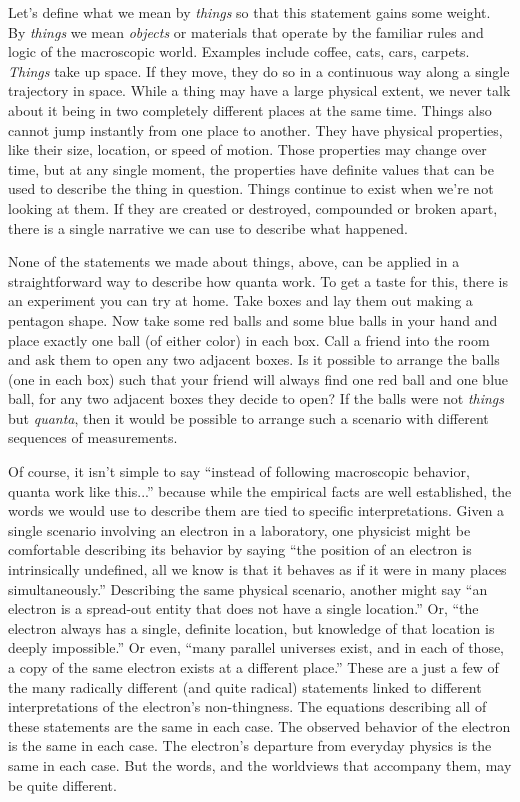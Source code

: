 \documentclass[onecolumn,preprintnumbers,amsmath,amssymbn,reprint,nofootinbib,superscriptaddress]{revtex4}    %
\begin{document}
Let's define what we mean by {\em things} so that this statement gains some weight.  By {\em things} we mean {\em objects} or materials that operate by the familiar rules and logic of the macroscopic world.  Examples include coffee, cats, cars, carpets.  {\em Things} take up space.  If they move, they do so in a continuous way along a single trajectory in space.  While a thing may have a large physical extent, we never talk about it being in two completely different places at the same time.  Things also cannot jump instantly from one place to another.  They have physical properties, like their size, location, or speed of motion.  Those properties may change over time, but at any single moment, the properties have definite values that can be used to describe the thing in question.  Things continue to exist when we're not looking at them.  If they are created or destroyed, compounded or broken apart, there is a single narrative we can use to describe what happened.  

None of the statements we made about things, above, can be applied in a straightforward way to describe how quanta work.  To get a taste for this, there is an experiment you can try at home. Take boxes and lay them out making a pentagon shape. Now take some red balls and some blue balls in your hand and place exactly one ball (of either color) in each box. Call a friend into the room and ask them to open any two adjacent boxes. Is it possible to arrange the balls (one in each box) such that your friend will always find one red ball and one blue ball, for any two adjacent boxes they decide to open?  If the balls were not \textit{things} but \textit{quanta}, then it would be possible to arrange such a scenario with different sequences of measurements.\cite{Liang}

Of course, it isn't simple to say ``instead of following macroscopic behavior, quanta work like this...''  because while the empirical facts are well established, the words we would use to describe them are tied to specific interpretations. Given a single scenario involving an electron in a laboratory, one physicist might be comfortable describing its behavior by saying ``the position of an electron is intrinsically undefined, all we know is that it behaves as if it were in many places simultaneously.''  Describing the same physical scenario, another might say ``an electron is a spread-out entity that does not have a single location.''  Or, ``the electron always has a single, definite location, but knowledge of that location is deeply impossible.''   Or even, ``many parallel universes exist, and in each of those, a copy of the same electron exists at a different place.'' These are a just a few of the many radically different (and quite radical) statements linked to different interpretations of the electron's non-thingness.  The equations describing all of these statements are the same in each case.  The observed behavior of the electron is the same in each case.  The electron's departure from everyday physics is the same in each case.  But the words, and the worldviews that accompany them, may be quite different. 
\end{document}

